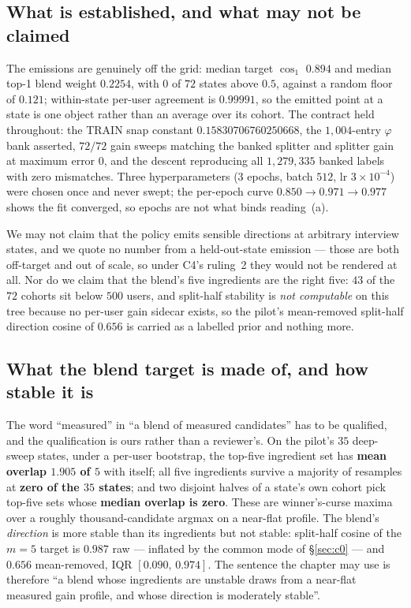 \documentclass[11pt]{article}
\begin{document}
\subsection{What is established, and what may not be claimed}

The emissions are genuinely off the grid: median target $\cos_1$ $0.894$ and median top-1 blend
weight $\mathbf{0.2254}$, with $0$ of $72$ states above $0.5$, against a random floor of $0.121$;
within-state per-user agreement is $0.99991$, so the emitted point at a state is one object rather
than an average over its cohort. The contract held throughout: the TRAIN snap constant
$0.15830706760250668$, the $1{,}004$-entry $\varphi$ bank asserted, $72/72$ gain sweeps matching the
banked splitter and splitter gain at maximum error $0$, and the descent reproducing all
$1{,}279{,}335$ banked labels with zero mismatches. Three hyperparameters (3 epochs, batch $512$,
lr $3\times10^{-4}$) were chosen once and never swept; the per-epoch curve
$0.850 \to 0.971 \to 0.977$ shows the fit converged, so epochs are not what binds reading~(a).

We may not claim that the policy emits sensible directions at arbitrary interview states, and we
quote no number from a held-out-state emission --- those are both off-target and out of scale, so
under C4's ruling~2 they would not be rendered at all. Nor do we claim that the blend's five
ingredients are the right five: $43$ of the $72$ cohorts sit below $500$ users, and split-half
stability is \emph{not computable} on this tree because no per-user gain sidecar exists, so the
pilot's mean-removed split-half direction cosine of $0.656$ is carried as a labelled prior and
nothing more.

\subsection{What the blend target is made of, and how stable it is}

The word ``measured'' in ``a blend of measured candidates'' has to be qualified, and the
qualification is ours rather than a reviewer's. On the pilot's $35$ deep-sweep states, under a
per-user bootstrap, the top-five ingredient set has \textbf{mean overlap $1.905$ of $5$} with
itself; all five ingredients survive a majority of resamples at \textbf{zero of the $35$ states};
and two disjoint halves of a state's own cohort pick top-five sets whose \textbf{median overlap is
zero}. These are winner's-curse maxima over a roughly thousand-candidate argmax on a near-flat
profile. The blend's \emph{direction} is more stable than its ingredients but not stable: split-half
cosine of the $m=5$ target is $0.987$ raw --- inflated by the common mode of \S\ref{sec:c0} --- and
$0.656$ mean-removed, IQR $[0.090,\,0.974]$. The sentence the chapter may use is therefore ``a blend
whose ingredients are unstable draws from a near-flat measured gain profile, and whose direction is
moderately stable''.
\end{document}

